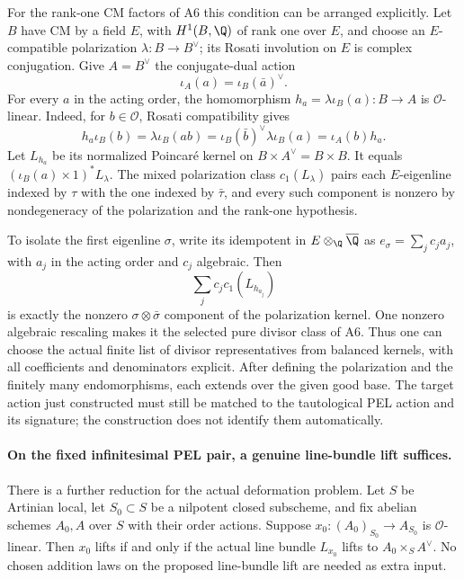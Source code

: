 For the rank-one CM factors of A6 this condition can be
arranged explicitly.  Let $B$ have CM by a field $E$,
with $H^1(B,\Q)$ of rank one over $E$, and choose an
$E$-compatible polarization $\lambda:B\to B^\vee$;
its Rosati involution on $E$ is complex conjugation.
Give $A=B^\vee$ the conjugate-dual action
\[
             \iota_A(a)=\iota_B(\bar a)^\vee.
\]
For every $a$ in the acting order, the homomorphism
$h_a=\lambda\iota_B(a):B\to A$ is $\mathcal O$-linear.
Indeed, for $b\in\mathcal O$, Rosati compatibility gives
\[
 h_a\iota_B(b)=\lambda\iota_B(ab)
      =\iota_B(\bar b)^\vee\lambda\iota_B(a)
      =\iota_A(b)h_a.
\]
Let $L_{h_a}$ be its normalized Poincar\'e kernel on
$B\times A^\vee=B\times B$.
It equals $(\iota_B(a)\times1)^*L_\lambda$.
The mixed polarization class $c_1(L_\lambda)$ pairs each
$E$-eigenline indexed by $\tau$ with the one indexed by
$\bar\tau$, and every such component is nonzero by
nondegeneracy of the polarization and the rank-one
hypothesis.

To isolate the first eigenline $\sigma$, write its
idempotent in $E\otimes_\Q\overline\Q$ as
$e_\sigma=\sum_j c_j a_j$, with $a_j$ in the acting
order and $c_j$ algebraic.  Then
\[
                     \sum_jc_jc_1(L_{h_{a_j}})
\]
is exactly the nonzero $\sigma\otimes\bar\sigma$
component of the polarization kernel.  One nonzero
algebraic rescaling makes it the selected pure divisor
class of A6.  Thus one can choose the actual finite
list of divisor representatives from balanced kernels,
with all coefficients and denominators explicit.
After defining the polarization and the finitely many
endomorphisms, each extends over the given good base.
The target action just constructed must still be matched
to the tautological PEL action and its signature;
the construction does not identify them automatically.

\paragraph{On the fixed infinitesimal PEL pair, a genuine line-bundle lift suffices.}
There is a further reduction for the actual deformation
problem.  Let $S$ be Artinian local, let $S_0\subset S$
be a nilpotent closed subscheme, and fix abelian schemes
$A_0,A$ over $S$ with their order actions.  Suppose
$x_0:(A_0)_{S_0}\to A_{S_0}$ is $\mathcal O$-linear.
Then $x_0$ lifts if and only if the actual line bundle
$L_{x_0}$ lifts to $A_0\times_S A^\vee$.
No chosen addition laws on the proposed line-bundle
lift are needed as extra input.

